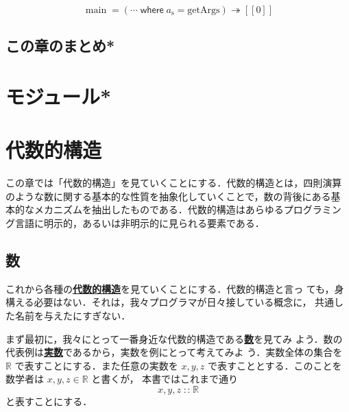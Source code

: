 \documentclass[a5paper,twoside,fleqn,draft]{jsbook}
\def\[{[\![}
\def\]{]\!]}
\newenvironment{leader}{\begingroup\gt}{\endgroup}
\newcommand{\keyword}[1]{{\underline{\textbf{#1}}}}
\newcommand{\mKeyword}[1]{\mathsf{#1}}
\newcommand{\mWhereKeyword}{\mKeyword{where}}
\DeclareMathOperator{\mWhere}{\mWhereKeyword}
\newcommand{\mAction}[1]{\mathrm{#1}}
\DeclareMathOperator{\mMain}{\mAction{main}}
\DeclareMathOperator{\mBindRightIgnore}{\twoheadrightarrow}
\DeclareMathOperator{\mIn}{{:\!:}}
\newcommand{\mSpecialSet}[1]{\mathbb{#1}}
\newcommand{\mRSet}{\mSpecialSet{R}}
\newcommand{\mPureWith}[1]{\[#1\]}
\newcommand{\mList}[1]{{#1}_\mathrm{s}}
\begin{document}
\begin{equation}
\mMain=(\dotsb\mWhere{}\mList{a}=\mAction{getArgs})\mBindRightIgnore\mPureWith{0}
\end{equation}

\section{この章のまとめ*}



\chapter{モジュール*}
\label{ch:module}

\chapter{代数的構造}
\label{ch:algebra}

\begin{leader}
この章では「代数的構造」を見ていくことにする．代数的構造とは，四則演算
のような数に関する基本的な性質を抽象化していくことで，数の背後にある基
本的なメカニズムを抽出したものである．代数的構造はあらゆるプログラミン
グ言語に明示的，あるいは非明示的に見られる要素である．
\end{leader}

\section{数}

これから各種の\keyword{代数的構造}を見ていくことにする．代数的構造と言っ
ても，身構える必要はない．それは，我々プログラマが日々接している概念に，
共通した名前を与えたにすぎない．

まず最初に，我々にとって一番身近な代数的構造である\keyword{数}を見てみ
よう．数の代表例は\keyword{実数}であるから，実数を例にとって考えてみよ
う．実数全体の集合を $\mRSet$ で表すことにする．また任意の実数を
$x,y,z$ で表すこととする．このことを数学者は $x,y,z\in\mRSet$ と書くが，
本書ではこれまで通り
\begin{equation}
x,y,z\mIn\mRSet
\end{equation}
と表すことにする．
\end{document}
